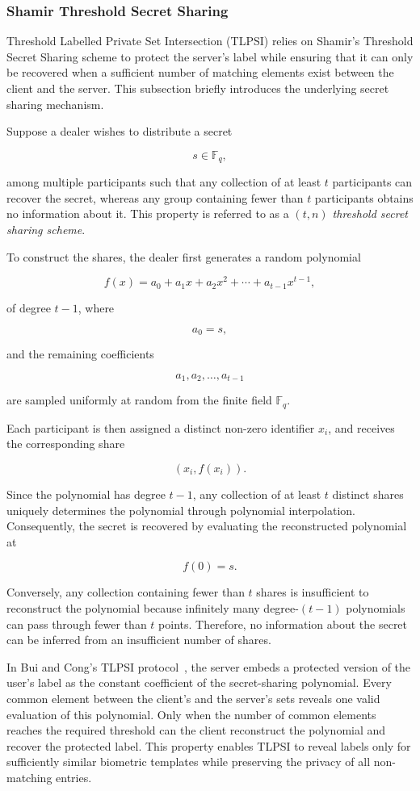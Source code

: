 \documentclass[11pt,a4paper]{article}
\begin{document}
\subsubsection{Shamir Threshold Secret Sharing}

Threshold Labelled Private Set Intersection (TLPSI) relies on
Shamir's Threshold Secret Sharing scheme to protect the server's
label while ensuring that it can only be recovered when a sufficient
number of matching elements exist between the client and the server.
This subsection briefly introduces the underlying secret sharing
mechanism.

Suppose a dealer wishes to distribute a secret

\[
s \in \mathbb{F}_q,
\]

among multiple participants such that any collection of at least
$t$ participants can recover the secret, whereas any group
containing fewer than $t$ participants obtains no information
about it. This property is referred to as a
\emph{$(t,n)$ threshold secret sharing scheme}.

To construct the shares, the dealer first generates a random
polynomial

\[
f(x)=a_0+a_1x+a_2x^2+\cdots+a_{t-1}x^{t-1},
\]

of degree $t-1$, where

\[
a_0=s,
\]

and the remaining coefficients

\[
a_1,a_2,\ldots,a_{t-1}
\]

are sampled uniformly at random from the finite field
$\mathbb{F}_q$.

Each participant is then assigned a distinct non-zero identifier
$x_i$, and receives the corresponding share

\[
(x_i,f(x_i)).
\]

Since the polynomial has degree $t-1$, any collection of at least
$t$ distinct shares uniquely determines the polynomial through
polynomial interpolation. Consequently, the secret is recovered by
evaluating the reconstructed polynomial at

\[
f(0)=s.
\]

Conversely, any collection containing fewer than $t$ shares is
insufficient to reconstruct the polynomial because infinitely many
degree-$(t-1)$ polynomials can pass through fewer than $t$ points.
Therefore, no information about the secret can be inferred from
an insufficient number of shares.

In Bui and Cong's TLPSI protocol~\cite{BuiCong25}, the server embeds a protected
version of the user's label as the constant coefficient of the
secret-sharing polynomial. Every common element between the
client's and the server's sets reveals one valid evaluation of this
polynomial. Only when the number of common elements reaches the
required threshold can the client reconstruct the polynomial and
recover the protected label. This property enables TLPSI to reveal
labels only for sufficiently similar biometric templates while
preserving the privacy of all non-matching entries.
\end{document}
